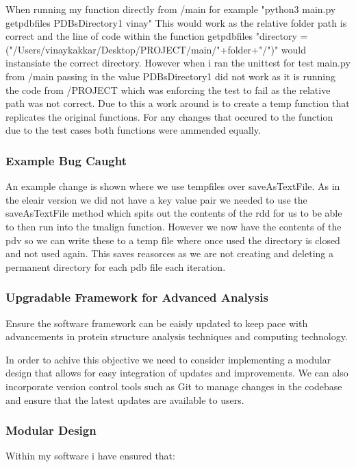 \documentclass[]{final_report}
\begin{document}
When running my function directly from /main for example "python3 main.py getpdbfiles PDBsDirectory1 vinay" This would work as the relative folder path is correct and the line of code within the function getpdbfiles "directory = ("/Users/vinaykakkar/Desktop/PROJECT/main/"+folder+"/")" would instansiate the correct directory. However when i ran the unittest for test main.py from /main passing in the value PDBsDirectory1 did not work as it is running the code from /PROJECT which was enforcing the test to fail as the relative path was not correct. Due to this a work around is to create a temp function that replicates the original functions. For any changes that occured to the function due to the test cases both functions were ammended equally.

\subsubsection{Example Bug Caught}

An example change is shown where we use tempfiles over saveAsTextFile. As in the eleair version we did not have a key value pair we needed to use the saveAsTextFile method which spits out the contents of the rdd for us to be able to then run into the tmalign function. However we now have the contents of the pdv so we can write these to a temp file where once used the directory is closed and not used again. This saves reasorces as we are not creating and deleting a permanent directory for each pdb file each iteration.

\clearpage

\subsubsection{Upgradable Framework for Advanced Analysis}
\begin{displayquote}
    Ensure the software framework can be eaisly updated to keep pace with advancements
    in protein structure analysis techniques and computing technology.
\end{displayquote}

In order to achive this objective we need to consider implementing a modular design that allows for easy integration of updates and improvements. We can also incorporate version control tools such as Git to manage changes in the codebase and ensure that the latest updates are available to users.

\subsubsection{Modular Design}
Within my software i have ensured that:
\end{document}
